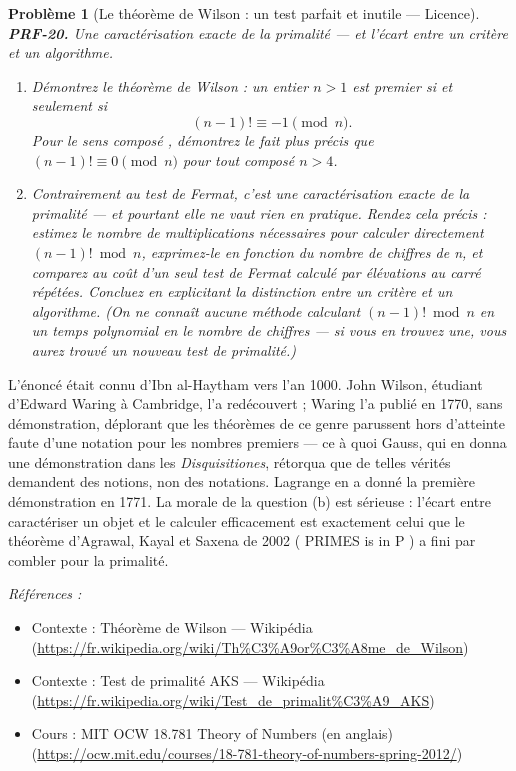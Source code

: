 \documentclass[11pt]{article}
\newtheorem{problem}{Problème}
\newenvironment{refs}{\par\small\noindent\emph{Références :}\begin{itemize}\setlength\itemsep{0pt}}{\end{itemize}\normalsize}
\begin{document}
\bigskip

\begin{problem}[{Le théorème de Wilson : un test parfait et inutile --- Licence}]
\textbf{PRF-20.} Une caractérisation exacte de la primalité --- et l'écart entre un
critère et un algorithme.
\begin{enumerate}
\item[(a)] Démontrez le théorème de Wilson : un entier
$ n >1 $ est premier si et seulement si
\[ (n-1)! \equiv -1 \pmod{n}. \]
Pour le sens \og{} composé \fg{}, démontrez le fait plus précis que $ (n-1)! \equiv 0 \pmod{n} $
pour tout composé $ n >4 $.
\item[(b)] Contrairement au test de Fermat, c'est une
caractérisation exacte de la primalité --- et pourtant elle ne vaut rien en pratique. Rendez
cela précis : estimez le nombre de multiplications nécessaires pour calculer directement
$ (n-1)! \bmod n $, exprimez-le en fonction du nombre de chiffres de n, et comparez au
coût d'un seul test de Fermat calculé par élévations au carré répétées. Concluez en
explicitant la distinction entre un \textit{critère} et un \textit{algorithme}. (On ne connaît
aucune méthode calculant $ (n-1)! \bmod n $ en un temps polynomial en le nombre de
chiffres --- si vous en trouvez une, vous aurez trouvé un nouveau test de primalité.)
\end{enumerate}

\end{problem}

\noindent L'énoncé était connu d'Ibn al-Haytham vers l'an 1000. John Wilson,
étudiant d'Edward Waring à Cambridge, l'a redécouvert ; Waring l'a publié en 1770, sans
démonstration, déplorant que les théorèmes de ce genre parussent hors d'atteinte faute d'une
notation pour les nombres premiers --- ce à quoi Gauss, qui en donna une démonstration dans les
\textit{Disquisitiones}, rétorqua que de telles vérités demandent des notions, non des
notations. Lagrange en a donné la première démonstration en 1771. La morale de la question
(b) est sérieuse : l'écart entre caractériser un objet et le calculer efficacement est
exactement celui que le théorème d'Agrawal, Kayal et Saxena de 2002 (\og{} PRIMES is in P \fg{}) a
fini par combler pour la primalité.

\begin{refs}
\item Contexte : Théorème de Wilson --- Wikipédia (\url{https://fr.wikipedia.org/wiki/Th%C3%A9or%C3%A8me_de_Wilson})
\item Contexte : Test de primalité AKS --- Wikipédia (\url{https://fr.wikipedia.org/wiki/Test_de_primalit%C3%A9_AKS})
\item Cours : MIT OCW 18.781 Theory of Numbers (en anglais) (\url{https://ocw.mit.edu/courses/18-781-theory-of-numbers-spring-2012/})
\end{refs}
\end{document}
